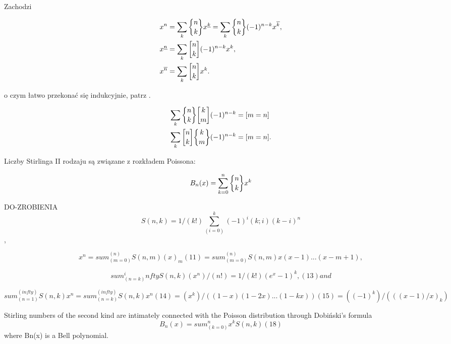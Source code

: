 Zachodzi

\begin{proposition}
\begin{align}
x^n & = \sum_{k} \stirlingtwo{n}{k} x\fallingfactorial{k} 
      = \sum_{k} \stirlingtwo{n}{k} (-1)^{n-k} x\raisingfactorial{k}, \\
x\fallingfactorial{n} & = \sum_{k} \stirlingone{n}{k} (-1)^{n-k} x^k, \\
x\raisingfactorial{n} & = \sum_{k} \stirlingone{n}{k} x^k.
\end{align}
\end{proposition}

o czym łatwo przekonać się indukcyjnie, patrz \cite[s. 294]{knuth}. %

\begin{proposition}
\begin{align}
	\sum_k \stirlingtwo{n}{k}\stirlingone{k}{m}(-1)^{n-k} & = [m = n] \\
	\sum_k \stirlingone{n}{k}\stirlingtwo{k}{m}(-1)^{n-k} & = [m = n].
\end{align}
\end{proposition}

Liczby Stirlinga II rodzaju są związane z rozkładem Poissona:

\begin{proposition}
\begin{equation}
	B_n(x) = \sum_{k= 0}^n \stirlingtwo{n}{k} x^k
\end{equation}
\end{proposition}

DO-ZROBIENIA
$$S(n,k)=1/(k!)\sum_(i=0)^k(-1)^i(k; i)(k-i)^n$$, 

$$x^n	=	sum_(m=0)^(n)S(n,m)(x)_m	
(11)
	=	sum_(m=0)^(n)S(n,m)x(x-1)...(x-m+1),$$

	 $$sum_(n=k)^inftyS(n,k)(x^n)/(n!)=1/(k!)(e^x-1)^k, 	
(13)
and$$


$$
sum_(n=1)^(infty)S(n,k)x^n	=	sum_(n=k)^(infty)S(n,k)x^n	
(14)
	=	(x^k)/((1-x)(1-2x)...(1-kx))	
(15)
	=	((-1)^k)/(((x-1)/x)_k)
$$

Stirling numbers of the second kind are intimately connected with the Poisson distribution through Dobiński's formula
$$
 B_n(x)=sum_(k=0)^nx^kS(n,k) 	
(18)$$
where Bn(x) is a Bell polynomial.